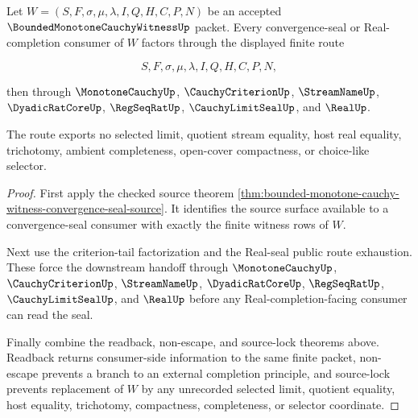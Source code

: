 \begin{theorem}
\label{thm:bounded-monotone-cauchy-witness-convergence-seal-route-exhaustion}
Let $W=(S,F,\sigma,\mu,\lambda,I,Q,H,C,P,N)$ be an accepted $\BoundedMonotoneCauchyWitnessUp$ packet. Every convergence-seal or Real-completion consumer of $W$ factors through the displayed finite route

$$
S,F,\sigma,\mu,\lambda,I,Q,H,C,P,N,
$$

then through $\MonotoneCauchyUp$, $\CauchyCriterionUp$, $\StreamNameUp$, $\DyadicRatCoreUp$, $\RegSeqRatUp$, $\CauchyLimitSealUp$, and $\RealUp$.

The route exports no selected limit, quotient stream equality, host real equality, trichotomy, ambient completeness, open-cover compactness, or choice-like selector.
\end{theorem}
\begin{proof}
First apply the checked source theorem \autoref{thm:bounded-monotone-cauchy-witness-convergence-seal-source}. It identifies the source surface available to a convergence-seal consumer with exactly the finite witness rows of $W$.

Next use the criterion-tail factorization and the Real-seal public route exhaustion. These force the downstream handoff through $\MonotoneCauchyUp$, $\CauchyCriterionUp$, $\StreamNameUp$, $\DyadicRatCoreUp$, $\RegSeqRatUp$, $\CauchyLimitSealUp$, and $\RealUp$ before any Real-completion-facing consumer can read the seal.

Finally combine the readback, non-escape, and source-lock theorems above. Readback returns consumer-side information to the same finite packet, non-escape prevents a branch to an external completion principle, and source-lock prevents replacement of $W$ by any unrecorded selected limit, quotient equality, host equality, trichotomy, compactness, completeness, or selector coordinate.
\end{proof}

